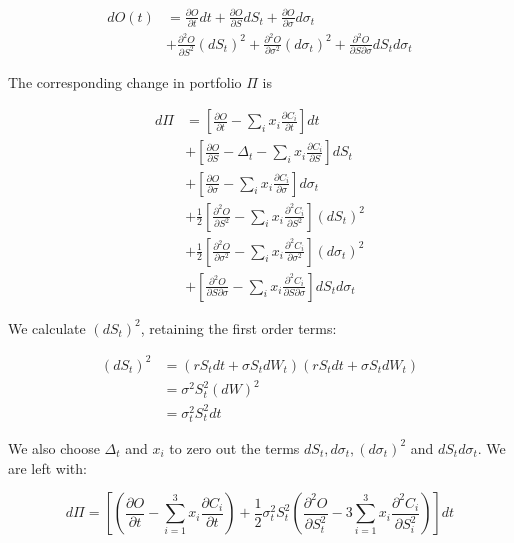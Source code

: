 \documentclass[]{tufte-book}
\begin{document}
\begin{align}
  dO(t) &= \frac{\partial O}{\partial t} dt + \frac{\partial O}{\partial S} dS_t + \frac{\partial O}{\partial \sigma} d\sigma_t \\
  &  + \frac{\partial^2 O}{\partial S^2} (dS_t)^2 + \frac{\partial^2 O}{\partial \sigma^2} (d\sigma_t)^2 + \frac{\partial^2 O}{\partial S \partial \sigma} dS_t d\sigma_t
  \end{align}

The corresponding change in portfolio \(\Pi\) is

\begin{align}
  d\Pi & = \left[ \frac{\partial O}{\partial t} - \sum_i x_i \frac{\partial C_i}{\partial t}  \right] dt  \\
  & + \left[ \frac{\partial O}{\partial S} - \Delta_t - \sum_i x_i \frac{\partial C_i}{\partial S}  \right] dS_t \\
  & + \left[ \frac{\partial O}{\partial \sigma} - \sum_i x_i \frac{\partial C_i}{\partial \sigma}  \right] d\sigma_t \\
  & + \frac{1}{2} \left[ \frac{\partial^2 O}{\partial S^2} - \sum_i x_i \frac{\partial^2 C_i}{\partial S^2}  \right] (dS_t)^2 \\
  & + \frac{1}{2} \left[ \frac{\partial^2 O}{\partial \sigma^2} - \sum_i x_i \frac{\partial^2 C_i}{\partial \sigma^2}  \right] (d\sigma_t)^2  \\
  & + \left[ \frac{\partial^2 O}{\partial S \partial \sigma} - \sum_i x_i \frac{\partial^2 C_i}{\partial S \partial \sigma}  \right] dS_t d\sigma_t
 \end{align}

We calculate \((dS_t)^2\), retaining the first order terms:

\begin{align}
(dS_t)^2 &= (rS_tdt + \sigma S_tdW_t) (rS_tdt + \sigma S_tdW_t) \\
&= \sigma^2S_t^2(dW)^2 \\
&= \sigma_t^2 S_t^2 dt
\end{align}

We also choose \(\Delta_t\) and \(x_i\) to zero out the terms
\(dS_t, d\sigma_t, (d\sigma_t)^2\) and \(dS_t d\sigma_t\). We are left with:

\[
d\Pi = \left[\left( \frac{\partial O}{\partial t} - \sum_{i=1}^3 x_i \frac{\partial C_i}{\partial t} \right) + \frac{1}{2} \sigma^2_t S^2_t \left(\frac{\partial^2 O}{\partial S^2_t} - 3\sum_{i=1}^3 x_i \frac{\partial^2 C_i}{\partial S_i^2} \right) \right] dt 
\]
\end{document}

